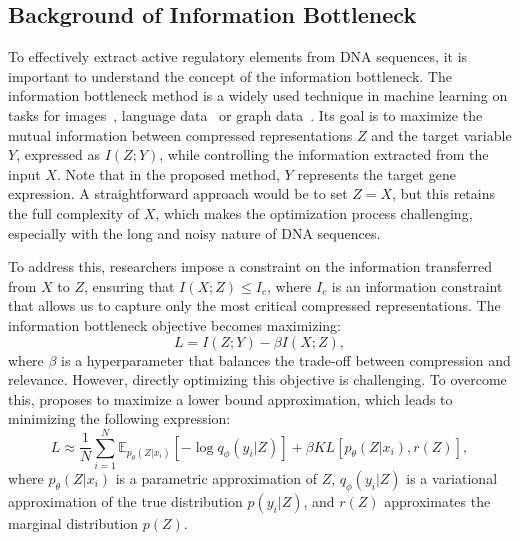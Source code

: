 

\subsection{Background of Information Bottleneck}
To effectively extract active regulatory elements from DNA sequences, it is important to understand the concept of the information bottleneck. 
The information bottleneck method is a widely used technique in machine learning on tasks for images~\citep{alemi2016deep, chen2018learning}, language data~\citep{belinkov2020variational, lei2016rationalizing, rnp_ib, bastings2019interpretable, jain2020learning} or graph data~\citep{wu2020graph, miao2022interpretable}.
Its goal is to maximize the mutual information between compressed representations $Z$ and the target variable $Y$, expressed as $I(Z; Y)$, while controlling the information extracted from the input $X$. Note that in the proposed method, $Y$ represents the target gene expression.
A straightforward approach would be to set $Z = X$, but this retains the full complexity of $X$, which makes the optimization process challenging, especially with the long and noisy nature of DNA sequences. 

To address this, researchers impose a constraint on the information transferred from $X$ to $Z$, ensuring that $I(X;Z) \leq I_c$, where $I_c$ is an information constraint that allows us to capture only the most critical compressed representations. The information bottleneck objective becomes maximizing:
\begin{equation}
\label{prelim:MI}
    L = I(Z;Y) - \beta I(X;Z),
\end{equation}
where $\beta$ is a hyperparameter that balances the trade-off between compression and relevance. However, directly optimizing this objective is challenging. To overcome this, \citet{chen2018learning} proposes to maximize a lower bound approximation, which leads to minimizing the following expression:
\begin{equation}
\label{IB}
    L \approx \frac{1}{N} \sum_{i=1}^N \mathbb{E}_{p_{\theta}(Z|x_i)} [-\log q_{\phi} (y_i|Z)] + \beta KL[p_{\theta}(Z|x_i), r(Z)],
\end{equation}
where $p_{\theta}(Z|x_i)$ is a parametric approximation of $Z$, $q_{\phi}(y_i|Z)$ is a variational approximation of the true distribution $p(y_i|Z)$, and $r(Z)$ approximates the marginal distribution $p(Z)$.


